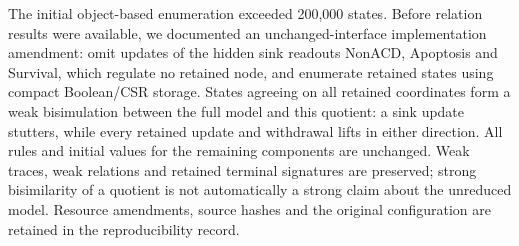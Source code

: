 The initial object-based enumeration exceeded 200,000 states. Before relation
results were available, we documented an unchanged-interface implementation
amendment: omit updates of the hidden sink readouts NonACD, Apoptosis and
Survival, which regulate no retained node, and enumerate retained states using
compact Boolean/CSR storage. States agreeing on all retained coordinates form
a weak bisimulation between the full model and this quotient: a sink update
stutters, while every retained update and withdrawal lifts in either direction.
All rules and initial values for the remaining components are unchanged.
Weak traces, weak relations and retained terminal signatures are preserved;
strong bisimilarity of a quotient is not automatically a strong claim about
the unreduced model. Resource amendments, source hashes and the original
configuration are retained in the reproducibility record.

